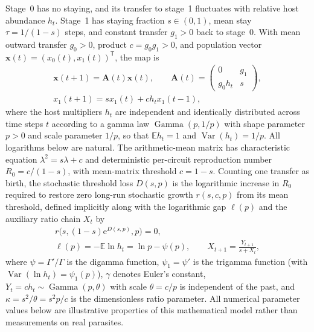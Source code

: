 Stage~0 has no staying, and its transfer to stage~1 fluctuates with relative host abundance $h_t$. Stage~1 has staying fraction $s\in(0,1)$, mean stay $\tau=1/(1-s)$ steps, and constant transfer $g_1>0$ back to stage~0. With mean outward transfer $g_0>0$, product $c=g_0g_1>0$, and population vector $\mathbf{x}(t)=(x_0(t),x_1(t))^{\mathsf{T}}$, the map is
\begin{equation}
\begin{gathered}
\mathbf{x}(t+1) = \mathbf{A}(t)\mathbf{x}(t), \qquad
\mathbf{A}(t) = \begin{pmatrix} 0 & g_1 \\ g_0 h_t & s \end{pmatrix},\\
x_1(t+1) = s x_1(t) + c h_t x_1(t-1),
\end{gathered}
\label{eq:exact-matrix}
\end{equation}
where the host multipliers $h_t$ are independent and identically distributed across time steps $t$ according to a gamma law $\operatorname{Gamma}(p, 1/p)$ with shape parameter $p > 0$ and scale parameter $1/p$, so that $\mathbb{E} h_t = 1$ and $\operatorname{Var}(h_t) = 1/p$. All logarithms below are natural. The arithmetic-mean matrix has characteristic equation $\lambda^2 = s\lambda + c$ and deterministic per-circuit reproduction number $R_0 = c/(1-s)$, with mean-matrix threshold $c = 1-s$. Counting one transfer as birth, the stochastic threshold loss $D(s,p)$ is the logarithmic increase in $R_0$ required to restore zero long-run stochastic growth $r(s,c,p)$ from its mean threshold, defined implicitly along with the logarithmic gap $\ell(p)$ and the auxiliary ratio chain $X_t$ by
\begin{equation}
\begin{gathered}
r\bigl(s, (1-s)\mathrm{e}^{D(s,p)}, p\bigr) = 0,\\
\ell(p) = -\mathbb{E}\ln h_t = \ln p - \psi(p), \qquad
X_{t+1} = \frac{Y_{t+1}}{s + X_t},
\end{gathered}
\label{eq:exact-defs}
\end{equation}
where $\psi = \Gamma'/\Gamma$ is the digamma function, $\psi_1 = \psi'$ is the trigamma function (with $\operatorname{Var}(\ln h_t) = \psi_1(p)$), $\gamma$ denotes Euler's constant, $Y_t = c h_t \sim \operatorname{Gamma}(p, \theta)$ with scale $\theta = c/p$ is independent of the past, and $\kappa = s^2/\theta = s^2 p/c$ is the dimensionless ratio parameter. All numerical parameter values below are illustrative properties of this mathematical model rather than measurements on real parasites.

